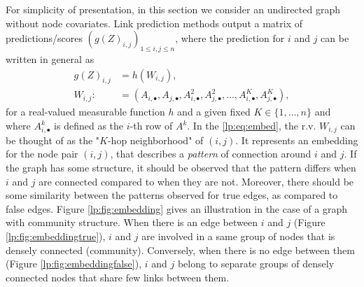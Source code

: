 \documentclass[a4paper, 11pt]{article}
\theoremstyle{remark}
\begin{document}
For simplicity of presentation, in this section we consider an undirected graph without node covariates. 
Link prediction methods output a matrix of predictions/scores $(g (Z)_{i,j})_{1 \leq i,j \leq n}$, where the prediction for $i$ and $j$ can be written in general as 
\begin{align} 
g (Z)_{i,j} &= h( W_{i,j} ), \label{lp:eq:scorelp} \\
W_{i,j} :&= (A_{i, \bullet}, A_{j, \bullet}, A^2_{i, \bullet}, A^2_{j, \bullet}, \dots, A^K_{i, \bullet}, A^K_{j, \bullet}) \label{lp:eq:embed}, 
\end{align}
for a real-valued measurable function $h$ and a given fixed $K \in \{1, \dots, n \}$ and where $A^k_{i, \bullet}$ is defined as the $i$-th row of  $A^k$. In the \eqref{lp:eq:embed}, the r.v. $W_{i,j}$ can be thought of as the "$K$-hop neighborhood" of $(i,j)$. It represents an embedding for the node pair $(i,j)$, that describes a \textit{pattern} of connection around $i$ and $j$. If the graph has some structure, it should be observed that the pattern differs when $i$ and $j$ are connected compared to when they are not. Moreover, there should be some similarity between the patterns observed for true edges, as compared to false edges. Figure \ref{lp:fig:embedding} gives an illustration in the case of a graph with community structure. When there is an edge between $i$ and $j$ (Figure \ref{lp:fig:embeddingtrue}), $i$ and $j$ are involved in a same group of nodes that is densely connected (community). Conversely, when there is no edge between them (Figure \ref{lp:fig:embeddingfalse}), $i$ and $j$ belong to separate groups of densely connected nodes that share few links between them. 
\end{document}
